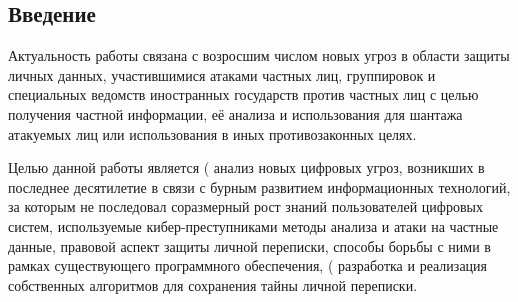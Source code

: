 \newpage
\parindent=1cm %
\begin{center}
	\section*{Введение} %
	\pagestyle{plain} %
	\setcounter{page}{3} %
\end{center}

Актуальность работы  связана с возросшим числом новых угроз в области защиты личных данных, участившимися атаками частных лиц, группировок и специальных ведомств иностранных государств против частных лиц с целью получения частной информации, её анализа и использования для шантажа атакуемых лиц или использования в иных противозаконных целях. 

Целью данной работы является (%
 анализ новых цифровых угроз, возникших в последнее десятилетие в связи с бурным развитием информационных технологий, за которым не последовал соразмерный рост знаний пользователей цифровых систем, используемые кибер-преступниками методы анализа и атаки на частные данные, правовой аспект защиты личной переписки, способы борьбы с ними в рамках существующего программного обеспечения, (%
разработка и реализация собственных алгоритмов для сохранения тайны личной переписки. 	